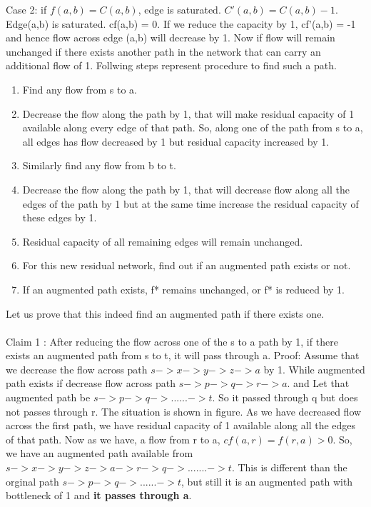 	Case 2: if $f(a,b) = C(a,b)$, edge is saturated. $C'(a,b) = C(a,b) - 1$. 
	Edge(a,b) is saturated. cf(a,b) = 0. If we reduce the capacity by 1, cf'(a,b) = -1 and hence flow across edge (a,b) will decrease by 1. Now if flow will remain unchanged if there exists another path in the network that can carry an additional flow of 1. Follwing steps represent procedure to find such a path.
	\begin{enumerate}
	\item Find any flow from s to a. 
	\item Decrease the flow along the path by 1, that will make residual capacity of 1 available along every edge of that path. So, along one of the path from s to a, all edges has flow decreased by 1 but residual capacity increased by 1. 
	\item Similarly find any flow from b to t.
	\item Decrease the flow along the path by 1, that will decrease flow along all the edges of the path by 1 but at the same time increase the residual capacity of these edges by 1. 
	\item Residual capacity of all remaining edges will remain unchanged. 
	\item For this new residual network, find out if an augmented path exists or not.
	\item If an augmented path exists, f* remains unchanged, or f* is reduced by 1. 
	\end{enumerate}		
	
	Let us prove that this indeed find an augmented path if there exists one.	
	\\
	\\
	Claim 1 : After reducing the flow across one of the s to a path by 1, if there exists an augmented path from s to t, it will pass through a. 
	Proof:	
	Assume that we decrease the flow across path $s->x->y->z->a$  by 1. While augmented path exists if decrease flow across path $s->p->q->r->a$. and Let that augmented path be $s->p->q->......->t$. So it passed through q but does not passes through r.
	The situation is shown in figure. 
	As we have decreased flow across the first path, we have residual capacity of 1 available along all the edges of that path. Now as we have, a flow from r to a, $cf(a,r) = f(r,a) > 0$. So, we have an augmented path available from $s->x->y->z->a->r->q->.......->t$. This is different than the orginal path $s->p->q->......->t$, but still it is an augmented path with bottleneck of 1 and \textbf{it passes through a}. 
	
